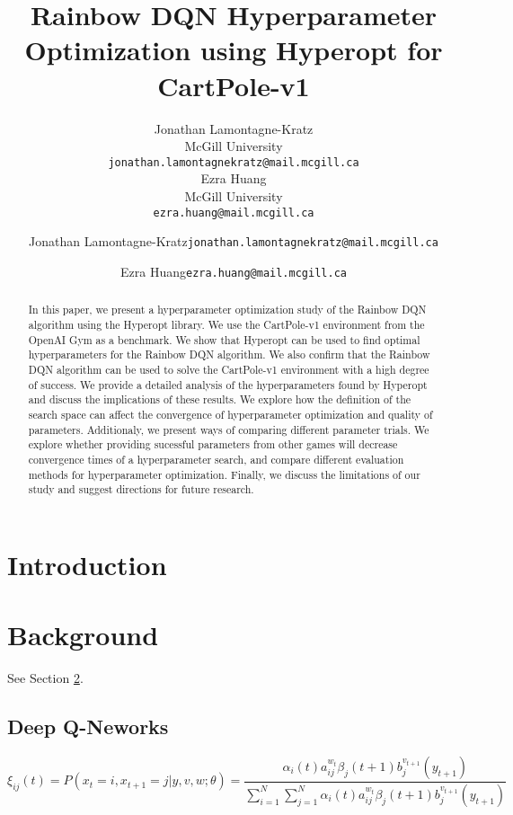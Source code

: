 \documentclass{article}
\title{Rainbow DQN Hyperparameter Optimization using Hyperopt for CartPole-v1
}
\author{%
  Jonathan Lamontagne-Kratz\\
  McGill University\\
  \texttt{jonathan.lamontagnekratz@mail.mcgill.ca} \\
  \And
  {Ezra Huang} \\
  McGill University\\
  \texttt{ezra.huang@mail.mcgill.ca} \\
}
\author[1]{%
	{\usebox\hspace{1mm}Jonathan Lamontagne-Kratz{\texttt{jonathan.lamontagnekratz@mail.mcgill.ca}}}%
}
\author[1,2]{%
    {\usebox\hspace{1mm}Ezra Huang{\texttt{ezra.huang@mail.mcgill.ca}}}%
}
\begin{document}
\maketitle

\begin{abstract}
    In this paper, we present a hyperparameter optimization study of the Rainbow DQN algorithm using the Hyperopt library. We use the CartPole-v1 environment from the OpenAI Gym as a benchmark. We show that Hyperopt can be used to find optimal hyperparameters for the Rainbow DQN algorithm. We also confirm that the Rainbow DQN algorithm can be used to solve the CartPole-v1 environment with a high degree of success. We provide a detailed analysis of the hyperparameters found by Hyperopt and discuss the implications of these results. We explore how the definition of the search space can affect the convergence of hyperparameter optimization and quality of parameters. Additionaly, we present ways of comparing different parameter trials. We explore whether providing sucessful parameters from other games will decrease convergence times of a hyperparameter search, and compare different evaluation methods for hyperparameter optimization. Finally, we discuss the limitations of our study and suggest directions for future research.
\end{abstract}



\section{Introduction}
\lipsum[2]
\lipsum[3]


\section{Background}
\label{sec:headings}

\lipsum[4] See Section \ref{sec:headings}.

\subsection{Deep Q-Neworks}
\lipsum[5]
\begin{equation}
  \xi _{ij}(t)=P(x_{t}=i,x_{t+1}=j|y,v,w;\theta)= {\frac {\alpha _{i}(t)a^{w_t}_{ij}\beta _{j}(t+1)b^{v_{t+1}}_{j}(y_{t+1})}{\sum _{i=1}^{N} \sum _{j=1}^{N} \alpha _{i}(t)a^{w_t}_{ij}\beta _{j}(t+1)b^{v_{t+1}}_{j}(y_{t+1})}}
\end{equation}
\end{document}
